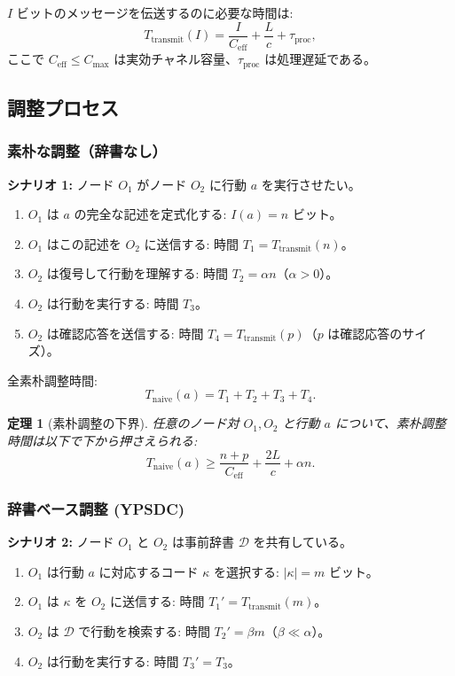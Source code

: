 \documentclass[12pt,a4paper]{ltjsarticle}
\newtheorem{theorem}{定理}
\begin{document}
	$I$ ビットのメッセージを伝送するのに必要な時間は:
	\[
	T_{\text{transmit}}(I) = \frac{I}{C_{\text{eff}}} + \frac{L}{c} + \tau_{\text{proc}},
	\]
	ここで $C_{\text{eff}} \leq C_{\text{max}}$ は実効チャネル容量、$\tau_{\text{proc}}$ は処理遅延である。
	
	\subsection{調整プロセス}
	\label{app:coordination-processes}
	
	\subsubsection{素朴な調整（辞書なし）}
	
	\textbf{シナリオ 1:} ノード $O_1$ がノード $O_2$ に行動 $a$ を実行させたい。
	
	\begin{enumerate}
		\item $O_1$ は $a$ の完全な記述を定式化する: $I(a) = n$ ビット。
		\item $O_1$ はこの記述を $O_2$ に送信する: 時間 $T_1 = T_{\text{transmit}}(n)$。
		\item $O_2$ は復号して行動を理解する: 時間 $T_2 = \alpha n$（$\alpha > 0$）。
		\item $O_2$ は行動を実行する: 時間 $T_3$。
		\item $O_2$ は確認応答を送信する: 時間 $T_4 = T_{\text{transmit}}(p)$（$p$ は確認応答のサイズ）。
	\end{enumerate}
	
	全素朴調整時間:
	\[
	T_{\text{naive}}(a) = T_1 + T_2 + T_3 + T_4.
	\]
	
	\begin{theorem}[素朴調整の下界]
		\label{thm:naive-lower-bound}
		任意のノード対 $O_1, O_2$ と行動 $a$ について、素朴調整時間は以下で下から押さえられる:
		\[
		T_{\text{naive}}(a) \geq \frac{n + p}{C_{\text{eff}}} + \frac{2L}{c} + \alpha n.
		\]
	\end{theorem}
	
	\subsubsection{辞書ベース調整 (YPSDC)}
	
	\textbf{シナリオ 2:} ノード $O_1$ と $O_2$ は事前辞書 $\mathcal{D}$ を共有している。
	
	\begin{enumerate}
		\item $O_1$ は行動 $a$ に対応するコード $\kappa$ を選択する: $|\kappa| = m$ ビット。
		\item $O_1$ は $\kappa$ を $O_2$ に送信する: 時間 $T_1' = T_{\text{transmit}}(m)$。
		\item $O_2$ は $\mathcal{D}$ で行動を検索する: 時間 $T_2' = \beta m$（$\beta \ll \alpha$）。
		\item $O_2$ は行動を実行する: 時間 $T_3' = T_3$。
	\end{enumerate}
	
\end{document}
